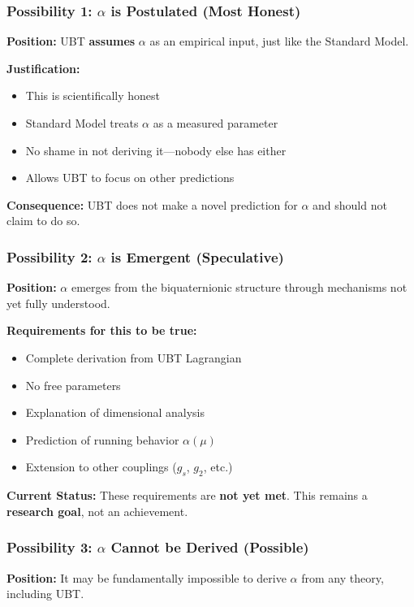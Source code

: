 \subsubsection{Possibility 1: $\alpha$ is Postulated (Most Honest)}

\textbf{Position:} UBT \textbf{assumes} $\alpha$ as an empirical input, just like the Standard Model.

\textbf{Justification:}
\begin{itemize}
\item This is scientifically honest
\item Standard Model treats $\alpha$ as a measured parameter
\item No shame in not deriving it—nobody else has either
\item Allows UBT to focus on other predictions
\end{itemize}

\textbf{Consequence:} UBT does not make a novel prediction for $\alpha$ and should not claim to do so.

\subsubsection{Possibility 2: $\alpha$ is Emergent (Speculative)}

\textbf{Position:} $\alpha$ emerges from the biquaternionic structure through mechanisms not yet fully understood.

\textbf{Requirements for this to be true:}
\begin{itemize}
\item Complete derivation from UBT Lagrangian
\item No free parameters
\item Explanation of dimensional analysis
\item Prediction of running behavior $\alpha(\mu)$
\item Extension to other couplings ($g_s$, $g_2$, etc.)
\end{itemize}

\textbf{Current Status:} These requirements are \textbf{not yet met}. This remains a \textbf{research goal}, not an achievement.

\subsubsection{Possibility 3: $\alpha$ Cannot be Derived (Possible)}

\textbf{Position:} It may be fundamentally impossible to derive $\alpha$ from any theory, including UBT.

